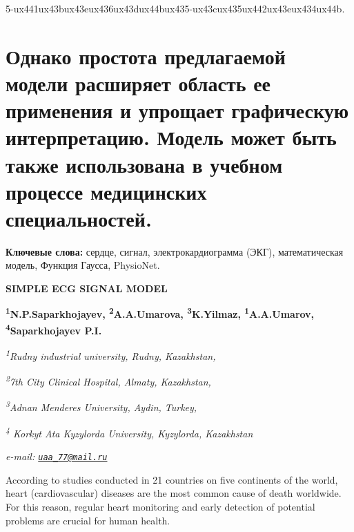 \documentclass[
]{article}
\begin{document}
{5-ux441ux43bux43eux436ux43dux44bux435-ux43cux435ux442ux43eux434ux44b.}

\section{Однако простота предлагаемой модели расширяет область ее
применения и упрощает графическую интерпретацию. Модель может быть также
использована в учебном процессе медицинских
специальностей.}\label{ux43eux434ux43dux430ux43aux43e-ux43fux440ux43eux441ux442ux43eux442ux430-ux43fux440ux435ux434ux43bux430ux433ux430ux435ux43cux43eux439-ux43cux43eux434ux435ux43bux438-ux440ux430ux441ux448ux438ux440ux44fux435ux442-ux43eux431ux43bux430ux441ux442ux44c-ux435ux435-ux43fux440ux438ux43cux435ux43dux435ux43dux438ux44f-ux438-ux443ux43fux440ux43eux449ux430ux435ux442-ux433ux440ux430ux444ux438ux447ux435ux441ux43aux443ux44e-ux438ux43dux442ux435ux440ux43fux440ux435ux442ux430ux446ux438ux44e.-ux43cux43eux434ux435ux43bux44c-ux43cux43eux436ux435ux442-ux431ux44bux442ux44c-ux442ux430ux43aux436ux435-ux438ux441ux43fux43eux43bux44cux437ux43eux432ux430ux43dux430-ux432-ux443ux447ux435ux431ux43dux43eux43c-ux43fux440ux43eux446ux435ux441ux441ux435-ux43cux435ux434ux438ux446ux438ux43dux441ux43aux438ux445-ux441ux43fux435ux446ux438ux430ux43bux44cux43dux43eux441ux442ux435ux439.}

\textbf{Ключевые слова:} сердце, сигнал, электрокардиограмма (ЭКГ),
математическая модель, Функция Гаусса, PhysioNet.

\textbf{SIMPLE ECG SIGNAL MODEL}

\textbf{\textsuperscript{1}N.P.Saparkhojayev,
\textsuperscript{2}A.A.Umarova, \textsuperscript{3}K.Yilmaz,
\textsuperscript{1}A.A.Umarov, \textsuperscript{4}Saparkhojayev P.I.}

\emph{\textsuperscript{1}Rudny industrial university, Rudny,
Kazakhstan,}

\emph{\textsuperscript{2}7th City Clinical Hospital, Almaty,
Kazakhstan,}

\emph{\textsuperscript{3}Adnan Menderes University, Aydin, Turkey,}

\emph{\textsuperscript{4} Korkyt Ata Kyzylorda University, Kyzylorda,
Kazakhstan}

\emph{e-mail: \href{mailto:uaa_77@mail.ru}{\nolinkurl{uaa\_77@mail.ru}}}

According to studies conducted in 21 countries on five continents of the
world, heart (cardiovascular) diseases are the most common cause of
death worldwide. For this reason, regular heart monitoring and early
detection of potential problems are crucial for human health.
\end{document}
